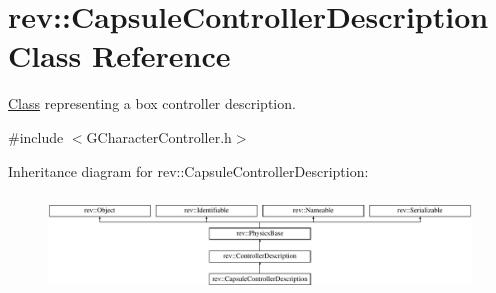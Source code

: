 \hypertarget{classrev_1_1_capsule_controller_description}{}\section{rev\+::Capsule\+Controller\+Description Class Reference}
\label{classrev_1_1_capsule_controller_description}


\mbox{\hyperlink{struct_class}{Class}} representing a box controller description.  




{\ttfamily \#include $<$G\+Character\+Controller.\+h$>$}

Inheritance diagram for rev\+::Capsule\+Controller\+Description\+:\begin{figure}[H]
\begin{center}
\leavevmode
\includegraphics[height=2.654028cm]{classrev_1_1_capsule_controller_description}
\end{center}
\end{figure}
